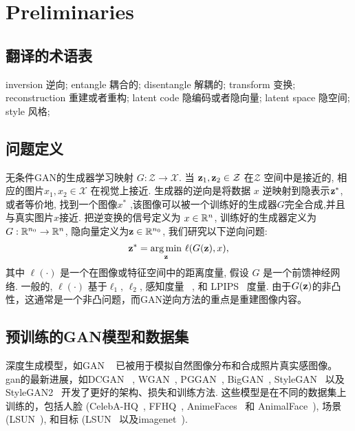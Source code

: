 \section{Preliminaries}
\label{sec:overview}

\subsection{翻译的术语表}
\label{sec:term}
inversion 逆向;
entangle 耦合的;
disentangle 解耦的;
transform 变换;
reconstruction 重建或者重构;
latent code 隐编码或者隐向量;
latent space 隐空间;
style 风格;

\subsection{问题定义}
\label{sec:definition}
无条件GAN的生成器学习映射 $G: \mathcal{Z} \to \mathcal{X}$. 
当 $\mathbf{z}_1, \mathbf{z}_2 \in \mathcal{Z}$ 在$\mathcal{Z}$ 空间中是接近的, 相应的图片$x_1, x_2 \in \mathcal{X}$ 在视觉上接近. 
生成器的逆向是将数据 $x$ 逆映射到隐表示$\mathbf{z}^*$, 或者等价地, 找到一个图像${x^*}$ ,该图像可以被一个训练好的生成器$G$完全合成,并且与真实图片$x$接近.
把逆变换的信号定义为 $x \in \mathbb{R}^{n}$, 训练好的生成器定义为$G: \mathbb{R}^{n_{0}} \to \mathbb{R}^{n}$, 隐向量定义为$\mathbf{z} \in \mathbb{R}^{n_{0}}$, 我们研究以下逆向问题:
\begin{equation}
\z^*=\underset{\z}{\arg \min } \ \ell(G(\z), x),
\label{eqn:def}
\end{equation}
其中 $\ell(\cdot)$ 是一个在图像或特征空间中的距离度量, 假设 $G$ 是一个前馈神经网络. 
一般的, $\ell(\cdot)$ 基于$\ell_1$, $\ell_2$, 感知度量 ~\cite{johnson2016perceptual}, 和 LPIPS~\cite{zhang2018unreasonable} 度量.
由于$G(\mathbf{z})$的非凸性，这通常是一个非凸问题，而GAN逆向方法的重点是重建图像内容。

\subsection{预训练的GAN模型和数据集}
\label{sec:model_data}
深度生成模型，如GAN ~\cite{goodfellow2014generative} 已被用于模拟自然图像分布和合成照片真实感图像。 gan的最新进展，如DCGAN ~\cite{radford2016dcgan}, WGAN~\cite{gulrajani2017improved}, PGGAN~\cite{karras2017progressive}, BigGAN~\cite{brock2018large}, StyleGAN~\cite{karras2019style} 以及 StyleGAN2~\cite{karras2020analyzing} 开发了更好的架构、损失和训练方法. 这些模型是在不同的数据集上训练的，包括人脸 (CelebA-HQ~\cite{karras2017progressive}, FFHQ~\cite{karras2019style,karras2020analyzing}, AnimeFaces~\cite{jin2017towards} 和 AnimalFace~\cite{liu2019funit}), 场景 (LSUN~\cite{yu2015lsun}), 和目标 (LSUN~\cite{yu2015lsun} 以及imagenet~\cite{russakovsky2015imagenet}).

